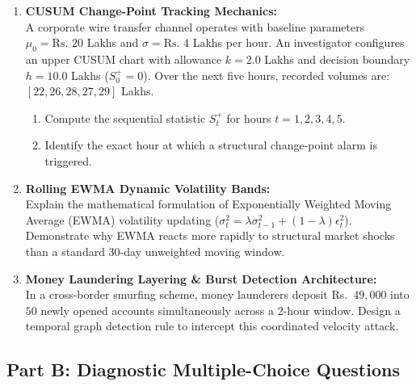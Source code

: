 \begin{enumerate}[label=\textbf{P10.\arabic*}]
    \item \textbf{CUSUM Change-Point Tracking Mechanics:}\\
    A corporate wire transfer channel operates with baseline parameters $\mu_0 = \text{Rs.~} 20$ Lakhs and $\sigma = \text{Rs.~} 4$ Lakhs per hour. An investigator configures an upper CUSUM chart with allowance $k = 2.0$ Lakhs and decision boundary $h = 10.0$ Lakhs ($S_0^+ = 0$). Over the next five hours, recorded volumes are: $[22, 26, 28, 27, 29]$ Lakhs.
    \begin{enumerate}[label=(\alph*)]
        \item Compute the sequential statistic $S_t^+$ for hours $t = 1, 2, 3, 4, 5$.
        \item Identify the exact hour at which a structural change-point alarm is triggered.
    \end{enumerate}

    \item \textbf{Rolling EWMA Dynamic Volatility Bands:}\\
    Explain the mathematical formulation of Exponentially Weighted Moving Average (EWMA) volatility updating ($\sigma_t^2 = \lambda \sigma_{t-1}^2 + (1 - \lambda) \epsilon_t^2$). Demonstrate why EWMA reacts more rapidly to structural market shocks than a standard 30-day unweighted moving window.

    \item \textbf{Money Laundering Layering \& Burst Detection Architecture:}\\
    In a cross-border smurfing scheme, money launderers deposit Rs.~$49{,}000$ into $50$ newly opened accounts simultaneously across a 2-hour window. Design a temporal graph detection rule to intercept this coordinated velocity attack.
\end{enumerate}

\subsection*{Part B: Diagnostic Multiple-Choice Questions}

